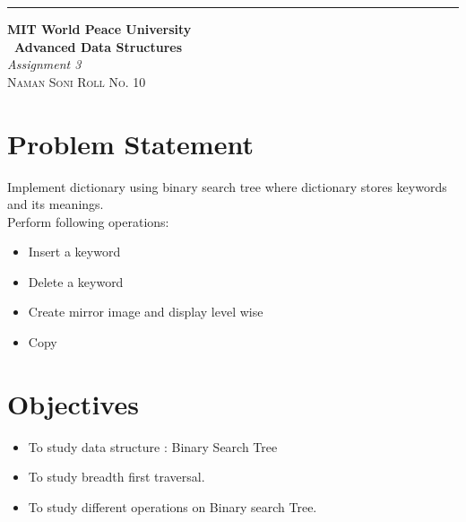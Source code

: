 \documentclass{article}
\begin{document}
	
	\begin{titlepage} %
	
	\raggedleft\rule{1pt}{\textheight} %
	\hspace{0.05\textwidth} %
	\parbox[b]{0.75\textwidth}
	{ %
		
		{\Huge\bfseries MIT World Peace University \\[0.5\baselineskip] \ Advanced Data Structures}\\[2\baselineskip] %
		{\large\textit{Assignment 3}}\\[4\baselineskip] %
		{\Large\textsc{Naman Soni Roll No. 10}} %
		
		\vspace{0.5\textheight} %
	}
	
\end{titlepage}
\tableofcontents
\pagebreak
\section{\textbf{Problem Statement}}
Implement dictionary using binary search tree where dictionary stores keywords and  its meanings.\\
Perform following operations:
\begin{itemize}
	\item  Insert a keyword
	\item  Delete a keyword
	\item  Create mirror image and display level wise
	\item Copy
\end{itemize}
\section{\textbf{Objectives}}
\begin{itemize}
	\item To study data structure : Binary Search Tree
	\item To study breadth first traversal.
	\item To study different operations on Binary search Tree.
\end{itemize}
\end{document}
